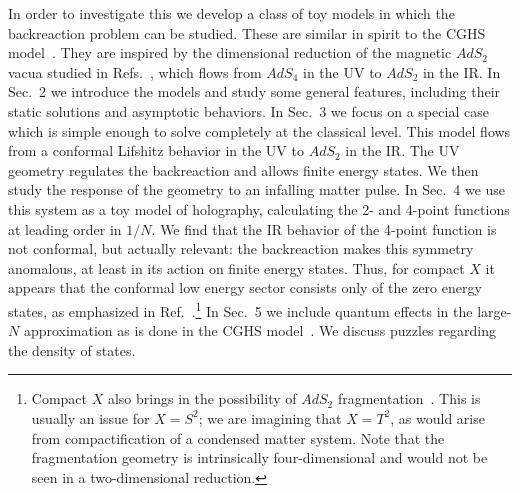 \documentclass[12pt]{article}
\begin{document}
In order to investigate this we develop a class of toy models in which the backreaction problem can be studied.  These are similar in spirit to the CGHS model~\cite{Callan:1992rs}.  They are inspired by the dimensional reduction of the magnetic $AdS_2$ vacua studied in Refs.~\cite{Hartnoll:2007ai,D'Hoker:2009mm,Almheiri:2011cb}, which flows from $AdS_4$ in the UV to $AdS_2$ in the \mbox{IR}.  
In Sec.~2 we introduce the models and study some general features, including their static solutions and asymptotic behaviors.  In Sec.~3 we focus on a special case which is simple enough to solve completely at the classical level.  This model flows from a conformal Lifshitz behavior in the UV to $AdS_2$ in the IR.  The UV geometry regulates the backreaction and allows finite energy states.  We then study the response of the geometry to an infalling matter pulse.  In Sec.~4 we use this system as a toy model of holography, calculating the 2- and 4-point functions at leading order in $1/N$.  We find that the IR behavior of the 4-point function is not conformal, but actually relevant: the backreaction makes this symmetry anomalous, at least in its action on finite energy states.  Thus, for compact $X$ it appears that the conformal low energy sector consists only of the zero energy states, as emphasized in Ref.~\cite{Sen:2008vm}.\footnote{Compact $X$ also brings in the possibility of $AdS_2$ fragmentation~\cite{Maldacena:1998uz}.  This is usually an issue for $X=S^2$; we are imagining that $X = T^2$, as would arise from compactification of a condensed matter system.  Note that the fragmentation geometry is intrinsically four-dimensional and would not be seen in a two-dimensional reduction.}   In Sec.~5 we include quantum effects in the large-$N$ approximation as is done in the CGHS model~\cite{Callan:1992rs}.  We discuss puzzles regarding the density of states.



\end{document}
